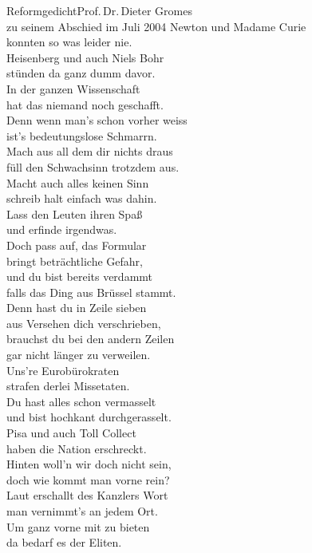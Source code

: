 \begin{lied*}{Reformgedicht}{Prof.\,Dr.\,Dieter Gromes\\zu seinem Abschied im Juli 2004}
Newton und Madame Curie\\
konnten so was leider nie.\\
Heisenberg und auch Niels Bohr\\
stünden da ganz dumm davor.\\
In der ganzen Wissenschaft\\
hat das niemand noch geschafft.\\
Denn wenn man's schon vorher weiss\\
ist's bedeutungslose Schmarrn.\\

Mach aus all dem dir nichts draus\\
füll den Schwachsinn trotzdem aus.\\
Macht auch alles keinen Sinn\\
schreib halt einfach was dahin.\\
Lass den Leuten ihren Spaß\\
und erfinde irgendwas.\\

Doch pass auf, das Formular\\
bringt beträchtliche Gefahr,\\
und du bist bereits verdammt\\
falls das Ding aus Brüssel stammt.\\
Denn hast du in Zeile sieben\\
aus Versehen dich verschrieben,\\
brauchst du bei den andern Zeilen\\
gar nicht länger zu verweilen.\\
Uns're Eurobürokraten\\
strafen derlei Missetaten.\\
Du hast alles schon vermasselt\\
und bist hochkant durchgerasselt.\\

Pisa und auch Toll Collect\\
haben die Nation erschreckt.\\
Hinten woll'n wir doch nicht sein,\\
doch wie kommt man vorne rein?\\

Laut erschallt des Kanzlers Wort\\
man vernimmt's an jedem Ort.\\
Um ganz vorne mit zu bieten\\
da bedarf es der Eliten.\\


\end{lied*}

